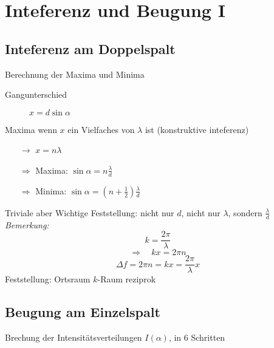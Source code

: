\documentclass[titlepage,11pt,a4paper,ngerman]{report}
\begin{document}

\section{Inteferenz und Beugung I}
\subsection{Inteferenz am Doppelspalt}

Berechnung der Maxima und Minima
\begin{description}
	\item[Gangunterschied] $x = d \sin \alpha$
\end{description}
Maxima wenn $x$ ein Vielfaches von $\lambda$ ist (konstruktive inteferenz)
\begin{itemize}
	\item[$\rightarrow$] $x = n \lambda$
	\item[$\Rightarrow$] Maxima: $\sin\alpha = n \frac{\lambda}{d}$
	\item[$\Rightarrow$] Minima: $\sin\alpha = \left(n + \frac{1}{2}\right)\frac{\lambda}{d}$
\end{itemize}

Triviale aber Wichtige Feststellung: nicht nur $d$, nicht nur $\lambda$, sondern $\frac{\lambda}{d}$\\
\emph{Bemerkung: } $$k= \frac{2\pi}{\lambda}$$
$$\Rightarrow \quad kx = 2 \pi n$$
$$\Delta f = 2\pi n = kx = \frac{2 \pi}{\lambda}x$$
Feststellung: Ortsraum $k$-Raum reziprok 




\subsection{Beugung am Einzelspalt}

Brechung der Intensitätsverteilungen $ I(\alpha) $, in 6 Schritten
\end{document}
